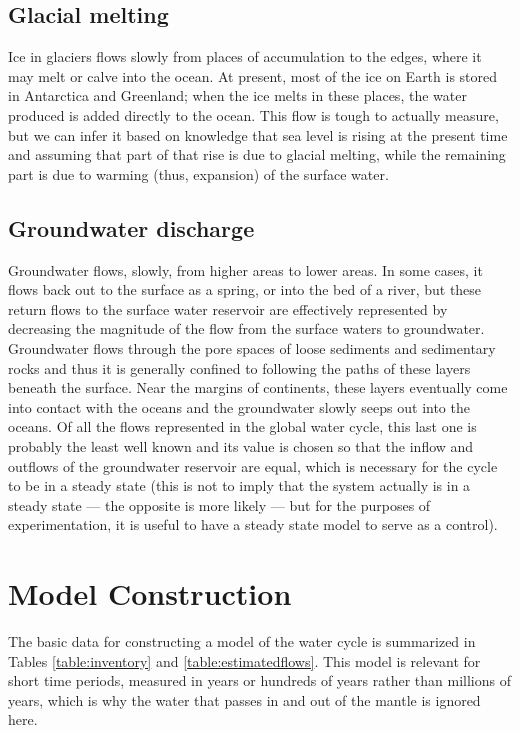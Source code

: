 \documentclass[11pt,letterpaper]{article}
\begin{document}
\subsection{Glacial melting}
Ice in glaciers flows slowly from places of accumulation to the edges, where it may melt or calve into the ocean. At present, most of the ice on Earth is stored in Antarctica and Greenland; when the ice melts in these places, the water produced is added directly to the ocean. This flow is tough to actually measure, but we can infer it based on knowledge that sea level is rising at the present time and assuming that part of that rise is due to glacial melting, while the remaining part is due to warming (thus, expansion) of the surface water.

\subsection{Groundwater discharge}
Groundwater flows, slowly, from higher areas to lower areas. In some cases, it flows back out to the surface as a spring, or into the bed of a river, but these return flows to the surface water reservoir are effectively represented by decreasing the magnitude of the flow from the surface waters to groundwater. Groundwater flows through the pore spaces of loose sediments and sedimentary rocks and thus it is generally confined to following the paths of these layers beneath the surface. Near the margins of continents, these layers eventually come into contact with the oceans and the groundwater slowly seeps out into the oceans. Of all the flows represented in the global water cycle, this last one is probably the least well known and its value is chosen so that the inflow and outflows of the groundwater reservoir are equal, which is necessary for the cycle to be in a steady state (this is not to imply that the system actually is in a steady state --- the opposite is more likely --- but for the purposes of experimentation, it is useful to have a steady state model to serve as a control).

\section{Model Construction}
The basic data for constructing a model of the water cycle is summarized in Tables \ref{table:inventory} and \ref{table:estimatedflows}. This model is relevant for short time periods, measured in years or hundreds of years rather than millions of years, which is why the water that passes in and out of the mantle is ignored here.
\end{document}
